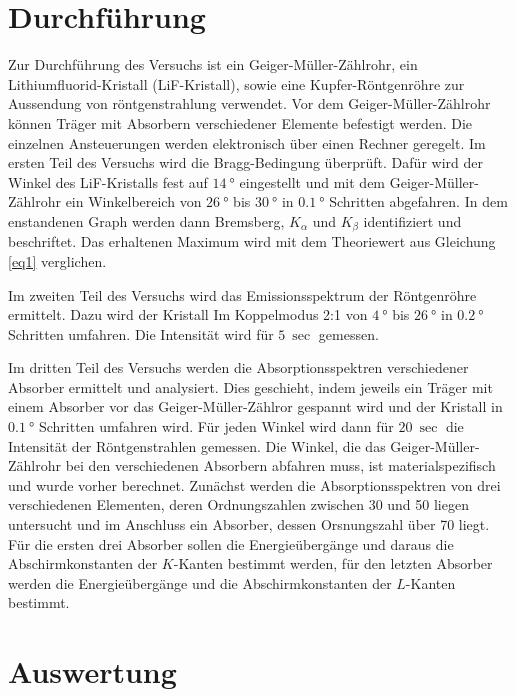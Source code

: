 \section{Durchführung}
Zur Durchführung des Versuchs ist ein Geiger-Müller-Zählrohr,
ein Lithiumfluorid-Kristall (LiF-Kristall), sowie eine Kupfer-Röntgenröhre zur Aussendung von röntgenstrahlung verwendet.
Vor dem Geiger-Müller-Zählrohr können Träger mit Absorbern verschiedener Elemente befestigt werden.
Die einzelnen Ansteuerungen werden elektronisch über einen Rechner geregelt.
Im ersten Teil des Versuchs wird die Bragg-Bedingung überprüft. Dafür wird der Winkel des LiF-Kristalls
fest auf $\SI{14}{\degree}$ eingestellt und mit dem Geiger-Müller-Zählrohr ein Winkelbereich
von $\SI{26}{\degree}$ bis $\SI{30}{\degree}$ in $\SI{0,1}{\degree}$ Schritten abgefahren. In dem enstandenen Graph werden
dann Bremsberg, $K_{\alpha}$ und $K_{\beta}$ identifiziert und beschriftet. Das erhaltenen Maximum wird
mit dem Theoriewert aus Gleichung \ref{eq1} verglichen.

\noindent Im zweiten Teil des Versuchs wird das Emissionsspektrum der Röntgenröhre ermittelt. Dazu wird der Kristall
Im Koppelmodus 2:1 von $\SI{4}{\degree}$ bis $\SI{26}{\degree}$ in $\SI{0,2}{\degree}$ Schritten umfahren.
Die Intensität wird für $\SI{5}{\sec}$ gemessen.

\noindent Im dritten Teil des Versuchs werden die Absorptionsspektren verschiedener Absorber ermittelt und analysiert.
Dies geschieht, indem jeweils ein Träger mit einem Absorber vor das Geiger-Müller-Zählror gespannt wird und
der Kristall in $\SI{0,1}{\degree}$ Schritten umfahren wird. Für jeden Winkel wird dann für $\SI{20}{\sec}$ die Intensität
der Röntgenstrahlen gemessen. Die Winkel, die das Geiger-Müller-Zählrohr bei den verschiedenen Absorbern
abfahren muss, ist materialspezifisch und wurde vorher berechnet.
Zunächst werden die Absorptionsspektren von drei verschiedenen Elementen, deren Ordnungszahlen zwischen 30 und 50 liegen
untersucht und im Anschluss ein Absorber, dessen Orsnungszahl über 70 liegt.
Für die ersten drei Absorber sollen die Energieübergänge und daraus die Abschirmkonstanten der $K$-Kanten bestimmt werden,
für den letzten Absorber werden die Energieübergänge und die Abschirmkonstanten der $L$-Kanten bestimmt.

\section{Auswertung}

